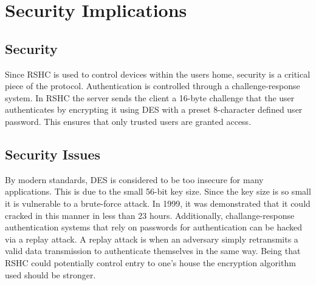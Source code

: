 \section{Security Implications}
\label{sec:security}

\subsection{Security}
\label{sec:security:sec}

Since RSHC is used to control devices within the users home, security is a critical piece of the protocol.  Authentication is controlled through a challenge-response system.  In RSHC the server sends the client a 16-byte challenge that the user authenticates by encrypting it using DES with a preset 8-character defined user password.  This ensures that only trusted users are granted access.

\subsection{Security Issues}
\label{sec:security:issues}

By modern standards, DES is considered to be too insecure for many applications.  This is due to the small 56-bit key size.  Since the key size is so small it is vulnerable to a brute-force attack.  In 1999, it was demonstrated that it could cracked in this manner in less than 23 hours.  Additionally, challange-response authentication systems that rely on passwords for authentication can be hacked via a replay attack.  A replay attack is when an adversary simply retransmits a valid data transmission to authenticate themselves in the same way. Being that RSHC could potentially control entry to one's house the encryption algorithm used should be stronger. 